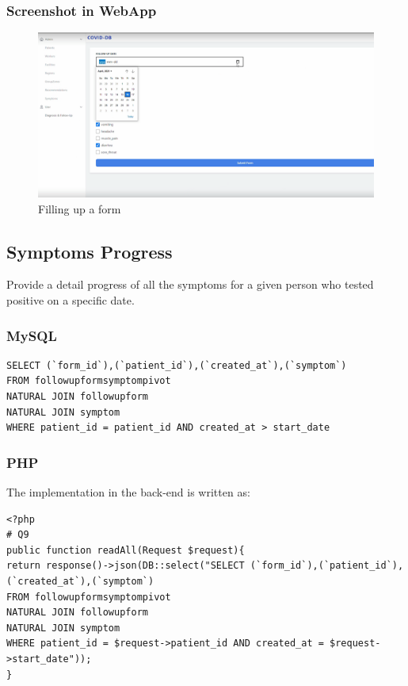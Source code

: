 \documentclass{article}
\begin{document}
\subsubsection{Screenshot in WebApp}    
\begin{figure}[h]
    \centering
    \includegraphics[scale=0.35]{imgs/fillingAForm.PNG}
    \caption{Filling up a form}
\end{figure}


\newpage

\subsection{Symptoms Progress}
Provide a detail progress of all the symptoms for a given person who tested positive on a specific date.
\subsubsection{MySQL}

\begin{verbatim}
SELECT (`form_id`),(`patient_id`),(`created_at`),(`symptom`)
FROM followupformsymptompivot 
NATURAL JOIN followupform
NATURAL JOIN symptom 
WHERE patient_id = patient_id AND created_at > start_date
\end{verbatim}

\subsubsection{PHP}
The implementation in the back-end is written as:
\begin{verbatim}
<?php
# Q9
public function readAll(Request $request){
return response()->json(DB::select("SELECT (`form_id`),(`patient_id`),(`created_at`),(`symptom`)
FROM followupformsymptompivot 
NATURAL JOIN followupform
NATURAL JOIN symptom 
WHERE patient_id = $request->patient_id AND created_at = $request->start_date"));
}
\end{verbatim}
\end{document}
